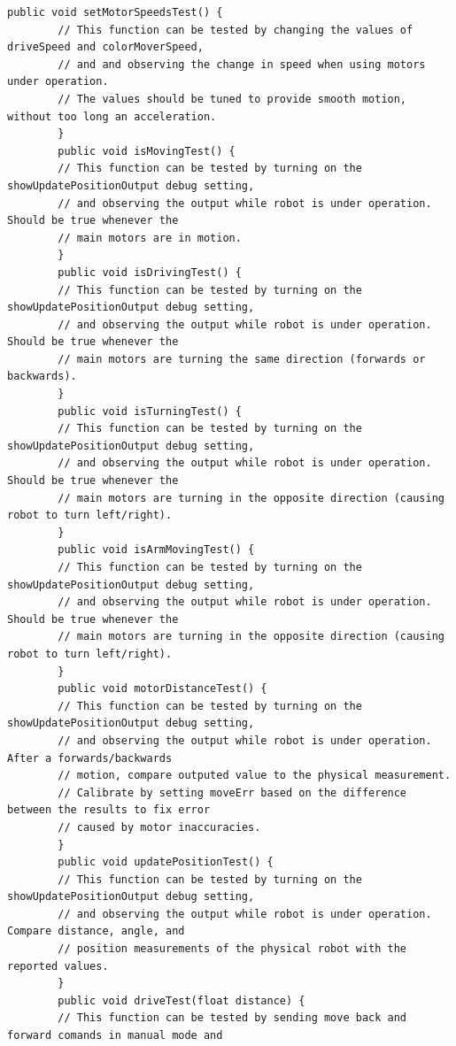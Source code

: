 \documentclass[12pt,a4paper]{article}
\begin{document}
	\begin{lstlisting}[caption=Robot motion manual test suite, captionpos=b, label={lst:RobotMotionManualTestSuite}]
	public void setMotorSpeedsTest() {
        // This function can be tested by changing the values of driveSpeed and colorMoverSpeed, 
        // and and observing the change in speed when using motors under operation.
        // The values should be tuned to provide smooth motion, without too long an acceleration.
        }
        public void isMovingTest() {
        // This function can be tested by turning on the showUpdatePositionOutput debug setting, 
        // and observing the output while robot is under operation. Should be true whenever the 
        // main motors are in motion.
        }
        public void isDrivingTest() {
        // This function can be tested by turning on the showUpdatePositionOutput debug setting, 
        // and observing the output while robot is under operation. Should be true whenever the 
        // main motors are turning the same direction (forwards or backwards).
        }
        public void isTurningTest() {
        // This function can be tested by turning on the showUpdatePositionOutput debug setting, 
        // and observing the output while robot is under operation. Should be true whenever the 
        // main motors are turning in the opposite direction (causing robot to turn left/right).
        }
        public void isArmMovingTest() {
        // This function can be tested by turning on the showUpdatePositionOutput debug setting, 
        // and observing the output while robot is under operation. Should be true whenever the 
        // main motors are turning in the opposite direction (causing robot to turn left/right).
        }
        public void motorDistanceTest() {
        // This function can be tested by turning on the showUpdatePositionOutput debug setting, 
        // and observing the output while robot is under operation. After a forwards/backwards
        // motion, compare outputed value to the physical measurement.
        // Calibrate by setting moveErr based on the difference between the results to fix error
        // caused by motor inaccuracies.
        }
        public void updatePositionTest() {
        // This function can be tested by turning on the showUpdatePositionOutput debug setting, 
        // and observing the output while robot is under operation. Compare distance, angle, and 
        // position measurements of the physical robot with the reported values.
        }
        public void driveTest(float distance) {
        // This function can be tested by sending move back and forward comands in manual mode and

\end{lstlisting}
\end{document}
